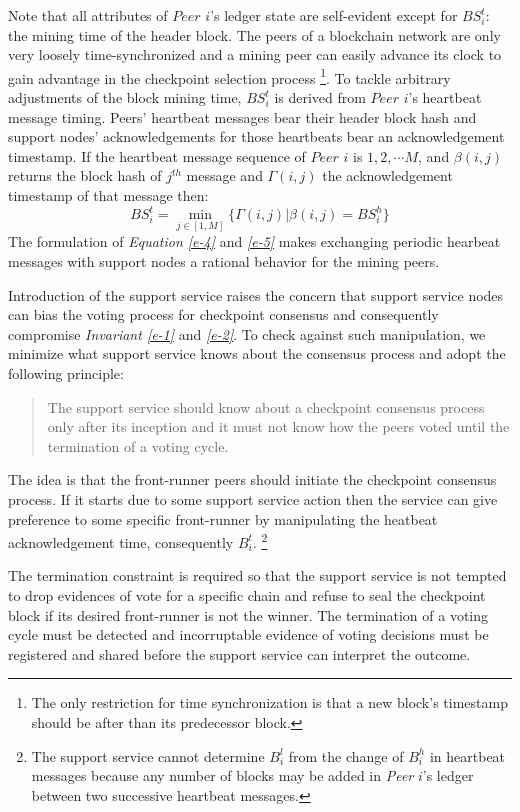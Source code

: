 Note that all attributes of $Peer$ $i$'s ledger state are self-evident except for $BS_i^t$: the mining time of the header block. The peers of a blockchain network are only very loosely time-synchronized \cite{Turek:1992:MFC:136541.136542} and a mining peer can easily advance its clock to gain advantage in the checkpoint selection process \footnote{The only restriction for time synchronization is that a new block's timestamp should be after than its predecessor block.}. To tackle arbitrary adjustments of the block mining time, $BS_i^t$ is derived from $Peer$ $i$'s heartbeat message timing. Peers' heartbeat messages bear their header block hash and support nodes' acknowledgements for those heartbeats bear an acknowledgement timestamp. If the heartbeat message sequence of $Peer$ $i$ is $1, 2, \cdots M$, and $\beta(i,j)$ returns the block hash of $j^{th}$ message and $\Gamma(i, j)$ the acknowledgement timestamp of that message then:
\begin{equation}
\label{e-5}
BS_i^t = \min_{j \in \left[ 1, M \right]}\{\Gamma(i, j) | \beta(i,j) = BS_i^h \}
\end{equation}
The formulation of \textit{Equation \ref{e-4}} and \textit{\ref{e-5}} makes exchanging periodic hearbeat messages with support nodes a rational behavior for the mining peers.

Introduction of the support service raises the concern that support service nodes can bias the voting process for checkpoint consensus and consequently compromise \textit{Invariant \ref{e-1}} and \textit{\ref{e-2}}. To check against such manipulation, we minimize what support service knows about the consensus process and adopt the following principle:

\begin{quote}
The support service should know about a checkpoint consensus process only after its inception and it must not know how the peers voted until the termination of a voting cycle.         
\end{quote}

The idea is that the front-runner peers should initiate the checkpoint consensus process. If it starts due to some support service action then the service can give preference to some specific front-runner by manipulating the heatbeat acknowledgement time, consequently $B_i^t$. \footnote{The support service cannot determine $B_i^l$ from the change of $B_i^h$ in heartbeat messages because any number of blocks may be added in \textit{Peer} $i$'s ledger between two successive heartbeat messages.}

The termination constraint is required so that the support service is not tempted to drop evidences of vote for a specific chain and refuse to seal the checkpoint block if its desired front-runner is not the winner. The termination of a voting cycle must be detected and incorruptable evidence of voting decisions must be registered and shared before the support service can interpret the outcome.                               

